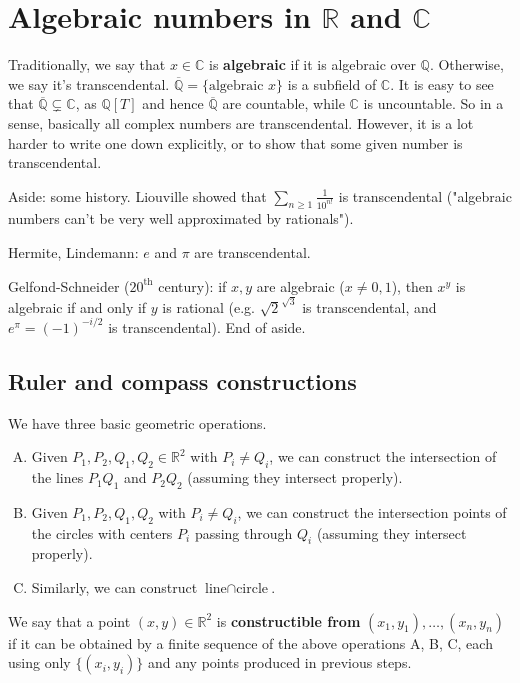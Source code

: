 \documentclass{article}
\theoremstyle{definition}
\begin{document}
\section{Algebraic numbers in $\mathbb{R}$ and $\mathbb{C}$}
Traditionally, we say that $x \in \mathbb{C}$ is \textbf{algebraic}  if it is algebraic over $\mathbb{Q}$. Otherwise, we say it's transcendental. $\overline{\mathbb{Q}} = \{\text{algebraic }x\}$ is a subfield of $\mathbb{C}$. It is easy to see that $\overline{\mathbb{Q}} \subsetneq \mathbb{C}$, as $\mathbb{Q}[T]$ and hence $\overline{\mathbb{Q}}$ are countable, while $\mathbb{C}$ is uncountable. So in a sense, basically all complex numbers are transcendental. However, it is a lot harder to write one down explicitly, or to show that some given number is transcendental.

Aside: some history. Liouville showed that $\sum_{n\ge 1}^{} \frac{1}{10^{n!}}$ is transcendental ("algebraic numbers can't be very well approximated by rationals").

Hermite, Lindemann: $e$ and $\pi$ are transcendental.

Gelfond-Schneider ($20^{\text{th}}$ century): if $x,y$ are algebraic ($x\neq 0,1$), then $x^y$ is algebraic if and only if $y$ is rational (e.g. $\sqrt{2}^{\sqrt{3}}$ is transcendental, and $e^{\pi} = (-1)^{-i/2}$ is transcendental). End of aside.


\subsection{Ruler and compass constructions}

We have three basic geometric operations.
\begin{enumerate}[(A)]
    \item Given $P_1,P_2,Q_1,Q_2 \in \mathbb{R}^2$ with $P_i \neq Q_i$, we can construct the intersection of the lines $P_1Q_1$ and $P_2Q_2$ (assuming they intersect properly).
    \item Given $P_1,P_2,Q_1,Q_2$ with $P_i \neq Q_i$, we can construct the intersection points of the circles with centers $P_i$ passing through $Q_i$ (assuming they intersect properly).
    \item Similarly, we can construct $\text{line} \cap \text{circle}$.
\end{enumerate}
We say that a point $(x,y) \in \mathbb{R}^2$ is \textbf{constructible from} $(x_1,y_1),\ldots,(x_n,y_n)$ if it can be obtained by a finite sequence of the above operations A, B, C, each using only $\{(x_i,y_i)\}$ and any points produced in previous steps.
\end{document}
